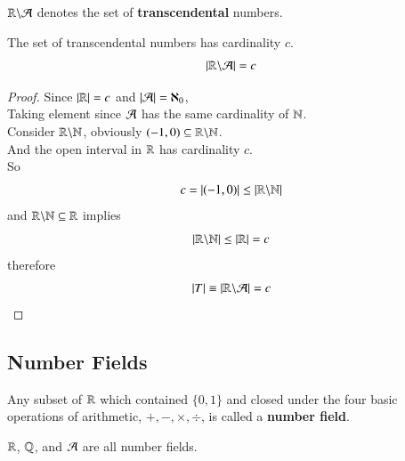 \documentclass[10pt]{article}
\begin{document}
		\begin{notation}
			$\mathbb{R} \backslash \mathcal{{A}}$ denotes the set of \textbf{transcendental} numbers.
		\end{notation}
		
		\begin{theorem}
			The set of transcendental numbers has cardinality $c$.
			\[
				|\mathbb{R} \backslash \mathcal{{A}}| = c
			\]
		\end{theorem}
		\begin{proof}
			Since $|\mathbb{R}| = c$ and $|\mathcal{{A}}| = \aleph_0$, \\
			Taking element since $\mathcal{{A}}$ has the same cardinality of $\mathbb{N}$. \\
			Consider $\mathbb{R} \backslash \mathbb{N}$, obviously $(-1,0) \subseteq \mathbb{R} \backslash \mathbb{N}$. \\
			And the open interval in $\mathbb{R}$ has cardinality $c$. \\
			So 
			\[
				c = |(-1,0)| \leq |\mathbb{R} \backslash \mathbb{N}|
			\]
			and $\mathbb{R} \backslash \mathbb{N} \subseteq \mathbb{R}$ implies 
			\[
				|\mathbb{R} \backslash \mathbb{N}| \leq |\mathbb{R}| = c
			\]
			therefore 
			\[
				|T| \equiv |\mathbb{R} \backslash \mathcal{{A}}| = c
			\]
		\end{proof}
		
		\subsection{Number Fields}
		\begin{definition}
			Any subset of $\mathbb{R}$ which contained $\{0,1\}$ and closed under the four basic operations of arithmetic, $+, -, \times, \div$, is called a \textbf{number field}.
		\end{definition}
		
		\begin{example}
			$\mathbb{R}$, $\mathbb{Q}$, and $\mathcal{{A}}$ are all number fields.
		\end{example}
		
\end{document}
